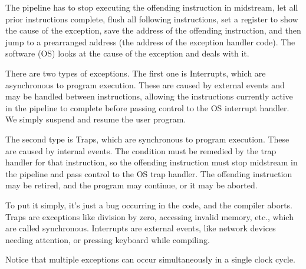The pipeline has to stop executing the offending instruction in midstream, let all prior instructions complete, flush all following instructions, set a register to show the cause of the exception, save the address of the offending instruction, and then jump to a prearranged address (the address of the exception handler code). The software (OS) looks at the cause of the exception and deals with it.

There are two types of exceptions. The first one is Interrupts, which are asynchronous to program execution. These are caused by external events and may be handled between instructions, allowing the instructions currently active in the pipeline to complete before passing control to the OS interrupt handler. We simply suspend and resume the user program.

The second type is Traps, which are synchronous to program execution. These are caused by internal events. The condition must be remedied by the trap handler for that instruction, so the offending instruction must stop midstream in the pipeline and pass control to the OS trap handler. The offending instruction may be retired, and the program may continue, or it may be aborted.

To put it simply, it's just a bug occurring in the code, and the compiler aborts. Traps are exceptions like division by zero, accessing invalid memory, etc., which are called synchronous. Interrupts are external events, like network devices needing attention, or pressing keyboard while compiling.

Notice that multiple exceptions can occur simultaneously in a single clock cycle.
